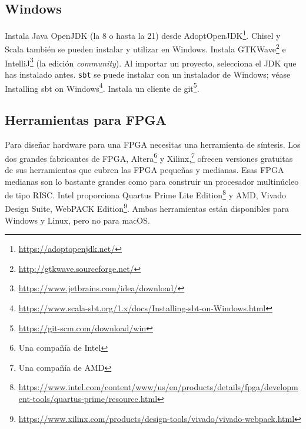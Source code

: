 \documentclass[%
    10pt,
    headinclude, footinclude=false,
    openright, %
    notitlepage,
    cleardoublepage=empty,
    headsepline,
    numbers=noenddot,
    bibliography=totoc, index=totoc,
    ]{scrbook}
\newcommand{\code}[1]{{\lstinline[basicstyle=\small\ttfamily]{#1}}}
\newcommand{\myref}[2]{\href{#1}{#2}}
\renewcommand{\myref}[2]{{#2}{\footnote{\url{#1}}}}
\begin{document}
\subsection{Windows}


Instala Java OpenJDK (la 8 o hasta la 21) desde \myref{https://adoptopenjdk.net/}{AdoptOpenJDK}.
Chisel y Scala también se pueden instalar y utilizar en Windows.
Instala \myref{http://gtkwave.sourceforge.net/}{GTKWave} e
\myref{https://www.jetbrains.com/idea/download/}{IntelliJ} (la edición \emph{community}).
Al importar un proyecto, selecciona el JDK que has instalado antes.
\code{sbt} se puede instalar con un instalador de Windows; véase
\myref{https://www.scala-sbt.org/1.x/docs/Installing-sbt-on-Windows.html}{Installing sbt on Windows}.
Instala un \myref{https://git-scm.com/download/win}{cliente de git}.

\subsection{Herramientas para FPGA}


Para diseñar hardware para una FPGA necesitas una herramienta de síntesis. Los dos grandes
fabricantes de FPGA, Altera\footnote{Una compañía de Intel}
y Xilinx,\footnote{Una compañía de AMD} ofrecen versiones gratuitas de
sus herramientas que cubren las FPGA pequeñas y medianas. Esas FPGA
medianas son lo bastante grandes como para construir un procesador multinúcleo de tipo RISC.
Intel proporciona \myref{https://www.intel.com/content/www/us/en/products/details/fpga/development-tools/quartus-prime/resource.html}{Quartus Prime Lite Edition} y AMD,
\myref{https://www.xilinx.com/products/design-tools/vivado/vivado-webpack.html}{Vivado Design Suite, WebPACK Edition}.
Ambas herramientas están disponibles para Windows y Linux, pero no para macOS.
\end{document}
